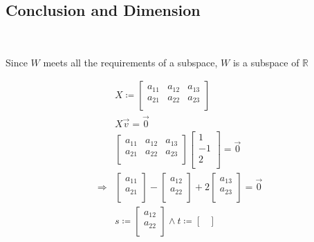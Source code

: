 \documentclass{article}
\def\R{\mathbb{R}}
\begin{document}
\subsection{Conclusion and Dimension}

~

Since $W$ meets all the requirements of a subspace, $W$ is a subspace of $\R$

\begin{equation*}
    \begin{split}
        &X\coloneqq \begin{bmatrix}
            a_{11}&a_{12}&a_{13}\\
            a_{21}&a_{22}&a_{23}\\
        \end{bmatrix}\\
        &X\overrightarrow{v}=\overrightarrow{0}\\
        &\begin{bmatrix}
            a_{11}&a_{12}&a_{13}\\
            a_{21}&a_{22}&a_{23}\\
        \end{bmatrix}\begin{bmatrix}
            1\\
            -1\\
            2\\
        \end{bmatrix}=\overrightarrow{0}\\
        \Rightarrow &\begin{bmatrix}
            a_{11}\\
            a_{21}\\
        \end{bmatrix}-\begin{bmatrix}
            a_{12}\\
            a_{22}\\
        \end{bmatrix}+2\begin{bmatrix}
            a_{13}\\
            a_{23}\\
        \end{bmatrix}=\overrightarrow{0}\\
        &s\coloneqq\begin{bmatrix}
            a_{12}\\
            a_{22}\\
        \end{bmatrix}\land t\coloneqq\begin{bmatrix}

\end{bmatrix}
\end{split}
\end{equation*}
\end{document}
